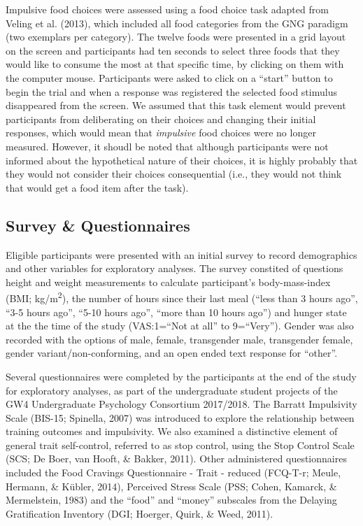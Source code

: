 \documentclass[man,floatsintext]{apa6}
\begin{document}
Impulsive food choices were assessed using a food choice task adapted
from Veling et al. (2013), which included all food categories from the
GNG paradigm (two exemplars per category). The twelve foods were
presented in a grid layout on the screen and participants had ten
seconds to select three foods that they would like to consume the most
at that specific time, by clicking on them with the computer mouse.
Participants were asked to click on a \enquote{start} button to begin
the trial and when a response was registered the selected food stimulus
disappeared from the screen. We assumed that this task element would
prevent participants from deliberating on their choices and changing
their initial responses, which would mean that \textit{impulsive} food
choices were no longer measured. However, it shoudl be noted that
although participants were not informed about the hypothetical nature of
their choices, it is highly probably that they would not consider their
choices consequential (i.e., they would not think that would get a food
item after the task).

\subsection{Survey \& Questionnaires}\label{survey_questionnaires}

\par

Eligible participants were presented with an initial survey to record
demographics and other variables for exploratory analyses. The survey
constited of questions height and weight measurements to calculate
participant's body-mass-index (BMI; kg/m\textsuperscript{2}), the number
of hours since their last meal (\enquote{less than 3 hours ago},
\enquote{3-5 hours ago}, \enquote{5-10 hours ago}, \enquote{more than 10
hours ago}) and hunger state at the the time of the study
(VAS:1=\enquote{Not at all} to 9=\enquote{Very}). Gender was also
recorded with the options of male, female, transgender male, transgender
female, gender variant/non-conforming, and an open ended text response
for \enquote{other}.

\par

Several questionnaires were completed by the participants at the end of
the study for exploratory analyses, as part of the undergraduate student
projects of the GW4 Undergraduate Psychology Consortium 2017/2018. The
Barratt Impulsivity Scale (BIS-15; Spinella, 2007) was introduced to
explore the relationship between training outcomes and impulsivity. We
also examined a distinctive element of general trait self-control,
referred to as stop control, using the Stop Control Scale (SCS; De Boer,
van Hooft, \& Bakker, 2011). Other administered questionnaires included
the Food Cravings Questionnaire - Trait - reduced (FCQ-T-r; Meule,
Hermann, \& Kübler, 2014), Perceived Stress Scale (PSS; Cohen, Kamarck,
\& Mermelstein, 1983) and the \enquote{food} and \enquote{money}
subscales from the Delaying Gratification Inventory (DGI; Hoerger,
Quirk, \& Weed, 2011).
\end{document}

